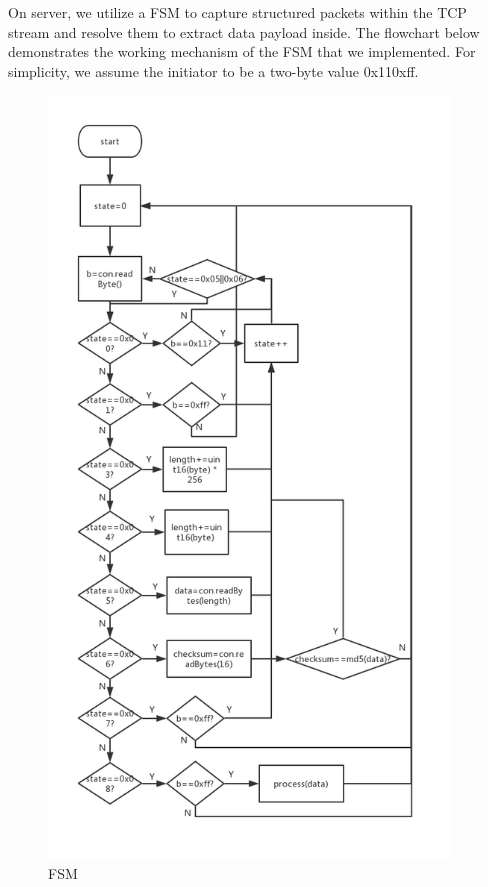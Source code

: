 \documentclass{article}
\begin{document}
On server, we utilize a FSM to capture structured packets within the TCP stream and resolve them to extract data payload inside. The flowchart below demonstrates the working mechanism of the FSM that we implemented.
\newline
\hfill \break
For simplicity, we assume the initiator to be a two-byte value 0x110xff.

 \begin{figure}[H]
     \centering
     \includegraphics[width=0.95\textwidth]{protocolflowchart}
     \caption{FSM}
     \label{fig:protocolflowchart}
 \end{figure}
\end{document}
